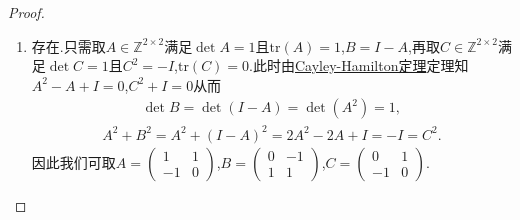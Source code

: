 \documentclass[../../main.tex]{subfiles}%
\begin{document}
\begin{proof}
\begin{enumerate}[(1)]
\item 存在.只需取$A\in \mathbb{Z}^{2 \times 2}$满足$\det A = 1$且$\mathrm{tr}(A) = 1$,$B = I - A$,再取$C\in \mathbb{Z}^{2 \times 2}$满足$\det C = 1$且$C^2 = -I$,$\mathrm{tr}(C) = 0$.此时由\hyperref[theorem:Cayley-Hamilton定理]{Cayley-Hamilton定理}定理知$A^2 - A + I = 0$,$C^2 + I = 0$从而
\begin{align*}
\det B = \det(I - A) = \det(A^2) = 1,
\end{align*}
\begin{align*}
A^2 + B^2 = A^2 + (I - A)^2 = 2A^2 - 2A + I = -I = C^2.
\end{align*}
因此我们可取$A = \begin{pmatrix} 1 & 1 \\ -1 & 0 \end{pmatrix}$,$B = \begin{pmatrix} 0 & -1 \\ 1 & 1 \end{pmatrix}$,$C = \begin{pmatrix} 0 & 1 \\ -1 & 0 \end{pmatrix}$.
\end{enumerate}

\end{proof}
\end{document}

